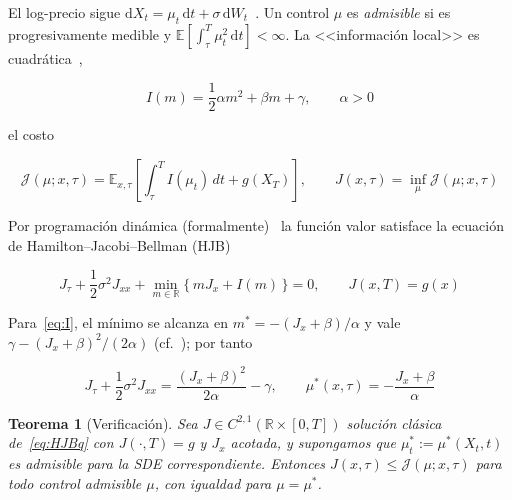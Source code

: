 \documentclass[11pt,letterpaper]{article}
\theoremstyle{plain}
\newtheorem{teorema}[theorem]{Teorema}
\theoremstyle{definition}
\theoremstyle{remark}
\numberwithin{equation}{section}
\newcommand{\R}{\mathbb{R}}
\newcommand{\E}{\mathbb{E}}
\newcommand{\dd}{\,\mathrm{d}}
\begin{document}
	El log-precio sigue \(\mathrm{d}X_t=\mu_t\dd t+\sigma\dd W_t\)~\cite[ec.~(3)]{Lindgren2020}. Un control \(\mu\) es \emph{admisible} si es progresivamente medible y \(\E\left[\int_\tau^T\mu_t^2\dd t\right]<\infty\). La <<información local>> es cuadrática~\cite[ec.~(5)]{Lindgren2020},
	
	\begin{equation}\label{eq:I}
		I(m)=\frac12\alpha m^2+\beta m+\gamma,\qquad \alpha>0
	\end{equation}
	
	el costo ~\cite[ec.~(6)-(7)]{Lindgren2020}
	
	\begin{equation}\label{eq:cost}
		\mathcal J(\mu;x,\tau)=\E_{x,\tau}\left[\int_\tau^T I(\mu_t)\,dt+g(X_T)\right],\qquad J(x,\tau)=\inf_\mu\mathcal J(\mu;x,\tau)
	\end{equation}
	
	Por programación dinámica (formalmente)~\cite[Sec.~2.2]{Lindgren2020} la función valor satisface la ecuación de Hamilton--Jacobi--Bellman (HJB)
	
	\begin{equation}\label{eq:HJB}
		J_\tau+\frac12\sigma^2J_{xx}+\min_{m\in\R}\{\,mJ_x+I(m)\,\}=0,\qquad J(x,T)=g(x)
	\end{equation}
	
	Para~\eqref{eq:I}, el mínimo se alcanza en \(m^\ast=-(J_x+\beta)/\alpha\) y vale \(\gamma-(J_x+\beta)^2/(2\alpha)\) (cf.~\cite[ec.~(9)--(13)]{Lindgren2020}); por tanto
	
	\begin{equation}\label{eq:HJBq}
		J_\tau+\frac12\sigma^2J_{xx}=\frac{(J_x+\beta)^2}{2\alpha}-\gamma,\qquad \mu^\ast(x,\tau)=-\frac{J_x+\beta}{\alpha}
	\end{equation}
	
	
	\begin{teorema}[Verificación]\label{teo:verif}
		Sea \(J\in C^{2,1}(\R\times[0,T])\) solución clásica de~\eqref{eq:HJBq} con \(J(\cdot,T)=g\) y \(J_x\) acotada, y supongamos que \(\mu^\ast_t:=\mu^\ast(X_t,t)\) es admisible para la SDE correspondiente. Entonces \(J(x,\tau)\le\mathcal J(\mu;x,\tau)\) para todo control admisible \(\mu\), con igualdad para \(\mu=\mu^\ast\).
	\end{teorema}
	
\end{document}
